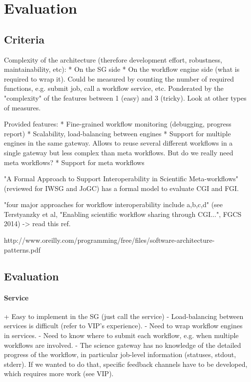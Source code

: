 \documentclass[preprint,3p,twocolumn]{elsarticle}
\begin{document}
\section{Evaluation}

\subsection{Criteria}

Complexity of the architecture (therefore development effort, robustness, maintainability, etc):
  * On the SG side
  * On the workflow engine side (what is required to wrap it).
Could be measured by counting the number of required functions,
e.g. submit job, call a workflow service, etc. Ponderated by the
"complexity" of the features between 1 (easy) and 3 (tricky). Look at
other types of measures.

Provided features:
  * Fine-grained workflow monitoring (debugging, progress report)
  * Scalability, load-balancing between engines
  * Support for multiple engines in the same gateway. Allows to reuse several different workflows in a single gateway but less complex than meta workflows. But do we really need meta workflows?
  * Support for meta workflows

"A Formal Approach to Support Interoperability in Scientific
Meta-workflows" (reviewed for IWSG and JoGC) has a formal model to
evaluate CGI and FGI.

"four major approaches for workflow interoperability include a,b,c,d" (see Terstyanzky et al, "Enabling scientific workflow sharing through CGI...", FGCS 2014) -> read this ref.

http://www.oreilly.com/programming/free/files/software-architecture-patterns.pdf

\subsection{Evaluation}

\paragraph{Service}
+ Easy to implement in the SG (just call the service)
- Load-balancing between services is difficult
(refer to VIP's experience).
- Need to wrap workflow engines in
services.
- Need to know where to submit each workflow, e.g. when
multiple workflows are involved.
- The science gateway has no
knowledge of the detailed progress of the workflow, in particular
job-level information (statuses, stdout, stderr). If we wanted to do
that, specific feedback channels have to be developed, which requires more work (see VIP).
\end{document}
